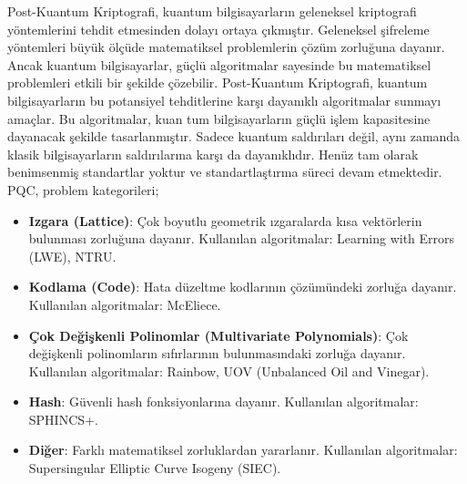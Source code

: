 Post-Kuantum Kriptografi, kuantum bilgisayarların geleneksel kriptografi yöntemlerini tehdit etmesinden dolayı ortaya çıkmıştır. Geleneksel şifreleme yöntemleri büyük ölçüde matematiksel problemlerin çözüm zorluğuna dayanır. Ancak kuantum bilgisayarlar, güçlü algoritmalar sayesinde bu matematiksel problemleri etkili bir şekilde çözebilir. Post-Kuantum Kriptografi, kuantum bilgisayarların bu potansiyel tehditlerine karşı dayanıklı algoritmalar sunmayı amaçlar. Bu algoritmalar, kuan tum bilgisayarların güçlü işlem kapasitesine dayanacak şekilde tasarlanmıştır. Sadece kuantum saldırıları değil, aynı zamanda klasik bilgisayarların saldırılarına karşı da dayanıklıdır. Henüz tam olarak benimsenmiş standartlar yoktur ve standartlaştırma süreci devam etmektedir. PQC, problem kategorileri;

\begin{itemize}
    \item \textbf{Izgara (Lattice)}: Çok boyutlu geometrik ızgaralarda kısa vektörlerin bulunması zorluğuna dayanır. Kullanılan algoritmalar: Learning with Errors (LWE), NTRU.
    \item \textbf{Kodlama (Code)}: Hata düzeltme kodlarının çözümündeki zorluğa dayanır. Kullanılan algoritmalar: McEliece.
    \item \textbf{Çok Değişkenli Polinomlar (Multivariate Polynomials)}: Çok değişkenli polinomların sıfırlarının bulunmasındaki zorluğa dayanır. Kullanılan algoritmalar: Rainbow, UOV (Unbalanced Oil and Vinegar).
    \item \textbf{Hash}: Güvenli hash fonksiyonlarına dayanır. Kullanılan algoritmalar: SPHINCS+.
    \item \textbf{Diğer}: Farklı matematiksel zorluklardan yararlanır. Kullanılan algoritmalar: Supersingular Elliptic Curve Isogeny (SIEC).
\end{itemize}

\newpage